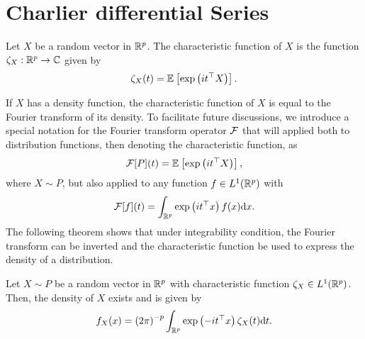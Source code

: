 \section{Charlier differential Series}


\begin{definition}
    Let $X$ be a random vector in $\Rp$. The characteristic function of $X$ is the function $\zeta_X : \Rp \rightarrow \C$ given by
    \begin{equation*}
        \zeta_X(t) = \expec{}{\expf{it^\top X}}.
    \end{equation*}
\end{definition}

If $X$ has a density function, the characteristic function of $X$ is equal to the Fourier transform of its density. To facilitate future discussions, we introduce a special notation for the Fourier transform operator $\F$ that will applied both to distribution functions, then denoting the characteristic function, as
\begin{equation} \label{eq-fourier-distrib}
    \F[P](t) = \expec{}{\expf{it^\top X}},
\end{equation}
where $X \sim P$, but also applied to any function $f \in L^1(\Rp)$ with
\begin{equation} \label{eq-fourier-density}
    \F[f](t) = \int_\Rp \expf{it^\top x}f(x)\d x.
\end{equation}
The following theorem shows that under integrability condition, the Fourier transform can be inverted and the characteristic function be used to express the density of a distribution.

\begin{theorem} \label{thm-char-inversion}
    Let $X \sim P$ be a random vector in $\Rp$ with characteristic function $\zeta_X \in L^1(\Rp)$. Then, the density of $X$ exists and is given by
    \begin{equation} \label{eq-density-via-charfun}
        f_X(x) = \left(2\pi\right)^{-p} \intRp{t}{ \expf{-it^\top x}\zeta_X(t) }.
    \end{equation}
\end{theorem}

